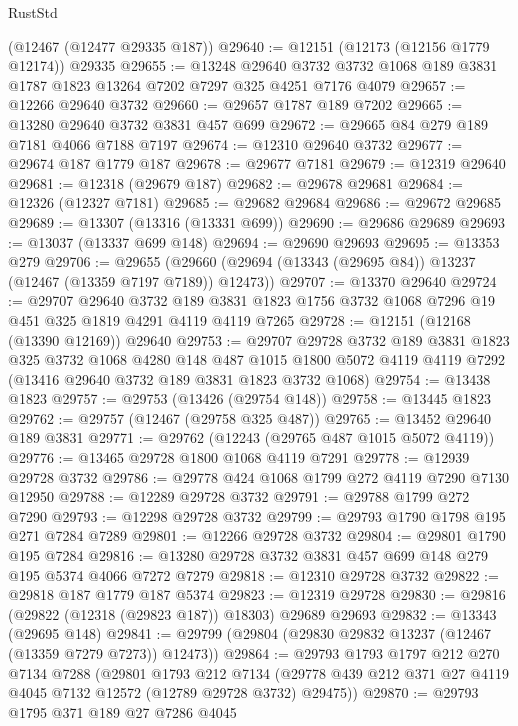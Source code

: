 \begin{lexlean}{RustStd}
\begin{coremodule}
    (@12467 (@12477 @29335 @187))
@29640 := @12151 (@12173 (@12156 @1779 @12174)) @29335
@29655 := @13248
    @29640
    @3732
    @3732
    @1068
    @189
    @3831
    @1787
    @1823
    @13264
    @7202
    @7297
    @325
    @4251
    @7176
    @4079
@29657 := @12266 @29640 @3732
@29660 := @29657 @1787 @189 @7202
@29665 := @13280 @29640 @3732 @3831 @457 @699
@29672 := @29665 @84 @279 @189 @7181 @4066 @7188 @7197
@29674 := @12310 @29640 @3732
@29677 := @29674 @187 @1779 @187
@29678 := @29677 @7181
@29679 := @12319 @29640
@29681 := @12318 (@29679 @187)
@29682 := @29678 @29681
@29684 := @12326 (@12327 @7181)
@29685 := @29682 @29684
@29686 := @29672 @29685
@29689 := @13307 (@13316 (@13331 @699))
@29690 := @29686 @29689
@29693 := @13037 (@13337 @699 @148)
@29694 := @29690 @29693
@29695 := @13353 @279
@29706 := @29655 (@29660 (@29694 (@13343 (@29695 @84)) @13237 (@12467 (@13359 @7197 @7189)) @12473))
@29707 := @13370 @29640
@29724 := @29707
    @29640
    @3732
    @189
    @3831
    @1823
    @1756
    @3732
    @1068
    @7296
    @19
    @451
    @325
    @1819
    @4291
    @4119
    @4119
    @7265
@29728 := @12151 (@12168 (@13390 @12169)) @29640
@29753 := @29707
    @29728
    @3732
    @189
    @3831
    @1823
    @325
    @3732
    @1068
    @4280
    @148
    @487
    @1015
    @1800
    @5072
    @4119
    @4119
    @7292
    (@13416 @29640 @3732 @189 @3831 @1823 @3732 @1068)
@29754 := @13438 @1823
@29757 := @29753 (@13426 (@29754 @148))
@29758 := @13445 @1823
@29762 := @29757 (@12467 (@29758 @325 @487))
@29765 := @13452 @29640 @189 @3831
@29771 := @29762 (@12243 (@29765 @487 @1015 @5072 @4119))
@29776 := @13465 @29728 @1800 @1068 @4119 @7291
@29778 := @12939 @29728 @3732
@29786 := @29778 @424 @1068 @1799 @272 @4119 @7290 @7130 @12950
@29788 := @12289 @29728 @3732
@29791 := @29788 @1799 @272 @7290
@29793 := @12298 @29728 @3732
@29799 := @29793 @1790 @1798 @195 @271 @7284 @7289
@29801 := @12266 @29728 @3732
@29804 := @29801 @1790 @195 @7284
@29816 := @13280 @29728 @3732 @3831 @457 @699 @148 @279 @195 @5374 @4066 @7272 @7279
@29818 := @12310 @29728 @3732
@29822 := @29818 @187 @1779 @187 @5374
@29823 := @12319 @29728
@29830 := @29816 (@29822 (@12318 (@29823 @187)) @18303) @29689 @29693
@29832 := @13343 (@29695 @148)
@29841 := @29799 (@29804 (@29830 @29832 @13237 (@12467 (@13359 @7279 @7273)) @12473))
@29864 := @29793
    @1793
    @1797
    @212
    @270
    @7134
    @7288
    (@29801
      @1793
      @212
      @7134
      (@29778 @439 @212 @371 @27 @4119 @4045 @7132 @12572 (@12789 @29728 @3732) @29475))
@29870 := @29793 @1795 @371 @189 @27 @7286 @4045

\end{coremodule}
\end{lexlean}
